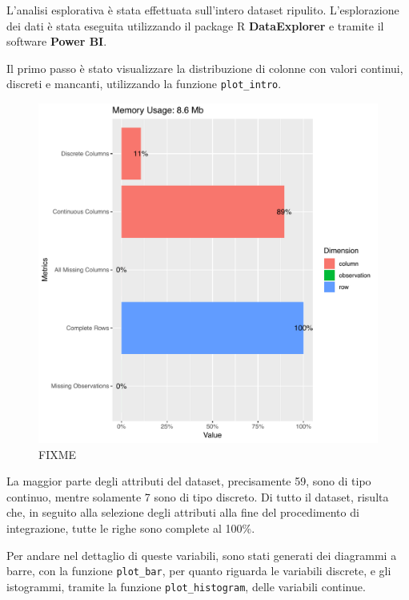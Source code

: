 L'analisi esplorativa è stata effettuata sull'intero dataset ripulito. 
L'esplorazione dei dati è stata eseguita utilizzando il package R 
\textbf{DataExplorer} e tramite il software \textbf{Power BI}.

Il primo passo è stato visualizzare la distribuzione di colonne con valori 
continui, discreti e mancanti, utilizzando la funzione \texttt{plot\_intro}.

\begin{figure}[htb]
	\centering
	\includegraphics[width=0.4\columnwidth]{images/ml/plot_intro}
	\caption{FIXME}
	\label{fig:plot_intro}
\end{figure}

La maggior parte degli attributi del dataset, precisamente 59, sono di tipo 
continuo, mentre solamente 7 sono di tipo discreto. Di tutto il dataset, 
risulta che, in seguito alla selezione degli attributi alla fine del 
procedimento di integrazione, tutte le righe sono complete al 100\%. 

Per andare nel dettaglio di queste variabili, sono stati generati dei diagrammi 
a barre, con la funzione \texttt{plot\_bar}, per quanto riguarda le variabili 
discrete, e gli istogrammi, tramite la funzione \texttt{plot\_histogram}, delle 
variabili continue.

